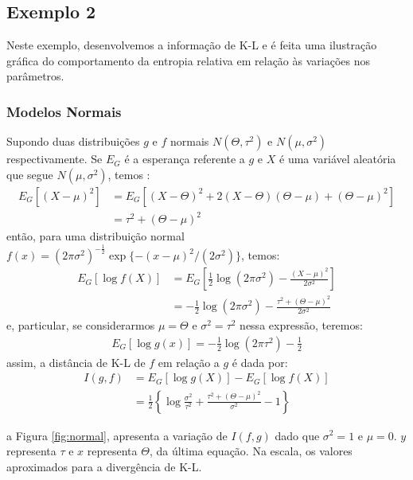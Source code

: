 \subsection{Exemplo 2}

Neste exemplo, desenvolvemos a informação de K-L e é feita uma ilustração gráfica do comportamento da entropia relativa em relação às variações nos parâmetros. 

\subsubsection{Modelos Normais}
\label{normal}

Supondo duas distribuições $g$ e $f$ normais $N(\Theta, \tau^2)$ e $N(\mu, \sigma^2)$ respectivamente. Se $E_G$ é a esperança referente a $g$ e $X$ é uma variável aleatória que segue $N(\mu, \sigma^2)$, temos \cite[p. 32]{konishi2008information} :
\begin{align*}
    E_G[(X - \mu)^2] &= E_G[(X - \Theta)^2 + 2(X - \Theta)(\Theta - \mu) + (\Theta - \mu)^2]\\
                     &= \tau^2 + (\Theta - \mu)^2
\end{align*}
então, para uma distribuição normal $f(x) = (2\pi\sigma^2)^{-\frac{1}{2}}\exp\{-(x - \mu)^2 / (2\sigma^2)\}$, temos:
\begin{align*}
    E_G[\log f(X)] &= E_G\left[\frac{1}{2}\log(2\pi\sigma^2)-\frac{(X-\mu)^2}{2\sigma^2}\right]\\
                   &= -\frac{1}{2}\log(2\pi\sigma^2) - \frac{\tau^2 + (\Theta - \mu)^2}{2\sigma^2}
\end{align*}
e, particular, se considerarmos $\mu = \Theta$ e $\sigma^2 = \tau^2$ nessa expressão, teremos:
\begin{align*}
    E_G[\log g(x)] = -\frac{1}{2}\log(2\pi\tau^2) - \frac{1}{2}
\end{align*}
assim, a distância de K-L de $f$ em relação a $g$ é dada por:
\begin{align*}
    I(g,f) &= E_G[\log g(X)] - E_G[\log f(X)]\\
           &= \frac{1}{2}\left\{\log\frac{\sigma^2}{\tau^2} + \frac{\tau^2 + (\Theta - \mu)^2}{\sigma^2} - 1 \right\}
\end{align*}

\noindent
a Figura \ref{fig:normal}, apresenta a variação de $I(f,g)$ dado que $\sigma^2 = 1$ e $\mu = 0$. $y$ representa $\tau$ e $x$ representa $\Theta$, da última equação. Na escala, os valores aproximados para a divergência de K-L.

